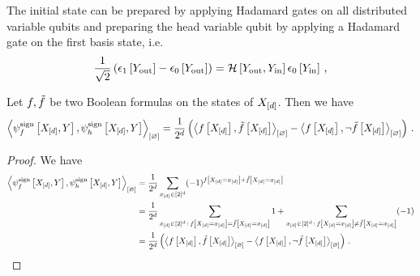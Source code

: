 The initial state can be prepared by applying Hadamard gates on all distributed variable qubits and preparing the head variable qubit by applying a Hadamard gate on the first basis state, i.e.
\begin{align*}
    \frac{1}{\sqrt{2}} \left( \epsilon_{1}\left[Y_{\mathrm{out}}\right] - \epsilon_{0}\left[Y_{\mathrm{out}}\right] \right)
    = \mathcal{H}\left[Y_{\mathrm{out}},Y_{\mathrm{in}}\right] \epsilon_{0}\left[Y_{\mathrm{in}}\right] \, ,
\end{align*}

\begin{lemma}
    \label{lem:signQstateOverlap}
    Let $f,\tilde{f}$ be two Boolean formulas on the states of $X_{[d]}$.
    Then we have
    \begin{align*}
        \left\langle \psi^{\mathrm{sign}}_{f}\left[X_{[d]},Y\right],\psi^{\mathrm{sign}}_{h}\left[X_{[d]},Y\right]\right\rangle_{\left[ \varnothing \right]}
        = \frac{1}{2^{d}} \left(\left\langle f\left[X_{[d]}\right],\tilde{f}\left[X_{[d]}\right]\right\rangle_{\left[ \varnothing \right]}-\left\langle f\left[X_{[d]}\right],\lnot\tilde{f}\left[X_{[d]}\right]\right\rangle_{\left[ \varnothing \right]}\right) \, .
    \end{align*}
\end{lemma}
\begin{proof}
    We have
    \begin{align*}
        \left\langle \psi^{\mathrm{sign}}_{f}\left[X_{[d]},Y\right],\psi^{\mathrm{sign}}_{h}\left[X_{[d]},Y\right]\right\rangle_{\left[ \varnothing \right]}
        &= \frac{1}{2^{d}}
        \sum_{x_{[d]}\in[2]^{d}} (-1)^{f\left[X_{[d]}=x_{[d]}\right]+\tilde{f}\left[X_{[d]}=x_{[d]}\right]}  \\
        &= \frac{1}{2^{d}}
        \sum_{x_{[d]}\in[2]^{d} \,:\, f\left[X_{[d]}=x_{[d]}\right]=\tilde{f}\left[X_{[d]}=x_{[d]}\right]} 1
        + \sum_{x_{[d]}\in[2]^{d} \,:\, f\left[X_{[d]}=x_{[d]}\right]\neq\tilde{f}\left[X_{[d]}=x_{[d]}\right]} (-1) \\
        &= \frac{1}{2^{d}} \left(\left\langle f\left[X_{[d]}\right],\tilde{f}\left[X_{[d]}\right]\right\rangle_{\left[ \varnothing \right]}-\left\langle f\left[X_{[d]}\right],\lnot\tilde{f}\left[X_{[d]}\right]\right\rangle_{\left[ \varnothing \right]}\right) \, .
    \end{align*}
\end{proof}

